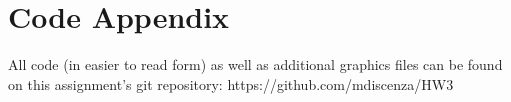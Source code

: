 \documentclass{article}
\begin{document}
\section{Code Appendix}
All code (in easier to read form) as well as additional graphics files can be found on this assignment's git repository:
https://github.com/mdiscenza/HW3







\begin{small}

 
\end{small}
\end{document}
